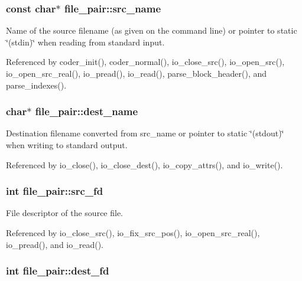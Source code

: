 \subsubsection[{src\-\_\-name}]{\setlength{\rightskip}{0pt plus 5cm}const char$\ast$ file\-\_\-pair\-::src\-\_\-name}\label{structfile__pair_abcd6b5b852a5bc8815a44dd025113bcf}
Name of the source filename (as given on the command line) or pointer to static \char`\"{}(stdin)\char`\"{} when reading from standard input. 

Referenced by coder\-\_\-init(), coder\-\_\-normal(), io\-\_\-close\-\_\-src(), io\-\_\-open\-\_\-src(), io\-\_\-open\-\_\-src\-\_\-real(), io\-\_\-pread(), io\-\_\-read(), parse\-\_\-block\-\_\-header(), and parse\-\_\-indexes().

\subsubsection[{dest\-\_\-name}]{\setlength{\rightskip}{0pt plus 5cm}char$\ast$ file\-\_\-pair\-::dest\-\_\-name}\label{structfile__pair_a7f1b46a8a665881ffa22d2d7b33b91ed}
Destination filename converted from src\-\_\-name or pointer to static \char`\"{}(stdout)\char`\"{} when writing to standard output. 

Referenced by io\-\_\-close(), io\-\_\-close\-\_\-dest(), io\-\_\-copy\-\_\-attrs(), and io\-\_\-write().

\subsubsection[{src\-\_\-fd}]{\setlength{\rightskip}{0pt plus 5cm}int file\-\_\-pair\-::src\-\_\-fd}\label{structfile__pair_acbab9ee46b39f49a7996360ae6dbe0a4}


File descriptor of the source file. 



Referenced by io\-\_\-close\-\_\-src(), io\-\_\-fix\-\_\-src\-\_\-pos(), io\-\_\-open\-\_\-src\-\_\-real(), io\-\_\-pread(), and io\-\_\-read().

\subsubsection[{dest\-\_\-fd}]{\setlength{\rightskip}{0pt plus 5cm}int file\-\_\-pair\-::dest\-\_\-fd}\label{structfile__pair_a95b05b836e2abd7cb9b227f03dcb5492}


